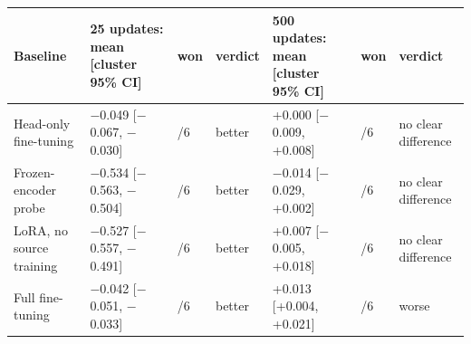 \documentclass[11pt,a4paper]{article}
\begin{document}
{\def\LTcaptype{none} %
{\small
\begin{longtable}[]{@{}
  >{\raggedright\arraybackslash}p{}
  >{\raggedright\arraybackslash}p{}
  >{\raggedright\arraybackslash}p{}
  >{\raggedright\arraybackslash}p{}
  >{\raggedright\arraybackslash}p{}
  >{\raggedright\arraybackslash}p{}
  >{\raggedright\arraybackslash}p{}@{}}
\toprule\noalign{}
\begin{minipage}[b]{\linewidth}\raggedright
Baseline
\end{minipage} & \begin{minipage}[b]{\linewidth}\raggedright
25 updates: mean {[}cluster 95\% CI{]}
\end{minipage} & \begin{minipage}[b]{\linewidth}\raggedright
won
\end{minipage} & \begin{minipage}[b]{\linewidth}\raggedright
verdict
\end{minipage} & \begin{minipage}[b]{\linewidth}\raggedright
500 updates: mean {[}cluster 95\% CI{]}
\end{minipage} & \begin{minipage}[b]{\linewidth}\raggedright
won
\end{minipage} & \begin{minipage}[b]{\linewidth}\raggedright
verdict
\end{minipage} \\
\midrule\noalign{}
\endhead
\bottomrule\noalign{}
\endlastfoot
Head-only fine-tuning & \ensuremath{-}0.049 {[}\ensuremath{-}0.067, \ensuremath{-}0.030{]} & 6/6 & better & +0.000 {[}\ensuremath{-}0.009, +0.008{]} & 2/6 & no clear difference \\
Frozen-encoder probe & \ensuremath{-}0.534 {[}\ensuremath{-}0.563, \ensuremath{-}0.504{]} & 6/6 & better & \ensuremath{-}0.014 {[}\ensuremath{-}0.029, +0.002{]} & 4/6 & no clear difference \\
LoRA, no source training & \ensuremath{-}0.527 {[}\ensuremath{-}0.557, \ensuremath{-}0.491{]} & 6/6 & better & +0.007 {[}\ensuremath{-}0.005, +0.018{]} & 2/6 & no clear difference \\
Full fine-tuning & \ensuremath{-}0.042 {[}\ensuremath{-}0.051, \ensuremath{-}0.033{]} & 6/6 & better & +0.013 {[}+0.004, +0.021{]} & 1/6 & worse \\

\end{longtable}}}
\end{document}
